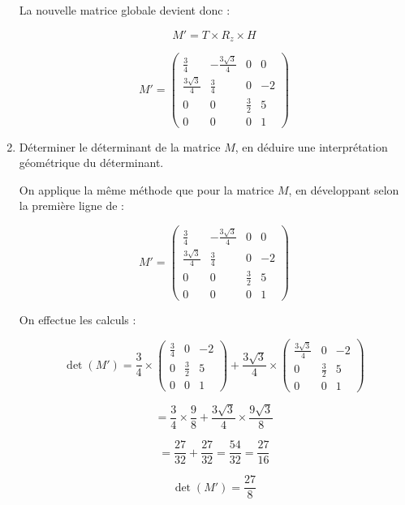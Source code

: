 \documentclass[a4paper,12pt]{article}
\begin{document}
\begin{enumerate}
    La nouvelle matrice globale devient donc :

    \[
    M' = T \times R_z \times H
    \]

    \[
    \boxed{
    M' =
    \begin{pmatrix}
    \frac{3}{4} & -\frac{3\sqrt{3}}{4} & 0 & 0 \\
    \frac{3\sqrt{3}}{4} & \frac{3}{4} & 0 & -2 \\
    0 & 0 & \frac{3}{2} & 5 \\
    0 & 0 & 0 & 1
    \end{pmatrix}
    }
    \] \newline

  \item Déterminer le déterminant de la matrice $M$, en déduire une interprétation géométrique du déterminant. \newline

    On applique la même méthode que pour la matrice \(M\), en développant selon la première ligne de :

    \[
    M' = 
    \begin{pmatrix}
    \frac{3}{4} & -\frac{3\sqrt{3}}{4} & 0 & 0 \\
    \frac{3\sqrt{3}}{4} & \frac{3}{4} & 0 & -2 \\
    0 & 0 & \frac{3}{2} & 5 \\
    0 & 0 & 0 & 1
    \end{pmatrix}
    \]

    On effectue les calculs :

    \[
    \det(M') =
    \frac{3}{4} \times 
    \begin{pmatrix}
    \frac{3}{4} & 0 & -2 \\
    0 & \frac{3}{2} & 5 \\
    0 & 0 & 1
    \end{pmatrix}
    + \frac{3\sqrt{3}}{4} \times 
    \begin{pmatrix}
    \frac{3\sqrt{3}}{4} & 0 & -2 \\
    0 & \frac{3}{2} & 5 \\
    0 & 0 & 1
    \end{pmatrix}
    \]

    \[
    = \frac{3}{4} \times \frac{9}{8} + \frac{3\sqrt{3}}{4} \times \frac{9\sqrt{3}}{8}
    \]

    \[
    = \frac{27}{32} + \frac{27}{32} = \frac{54}{32} = \frac{27}{16} 
    \]

    \[
    \boxed{
    \det(M') = \frac{27}{8}
    }
    \] \newline


\end{enumerate}
\end{document}

